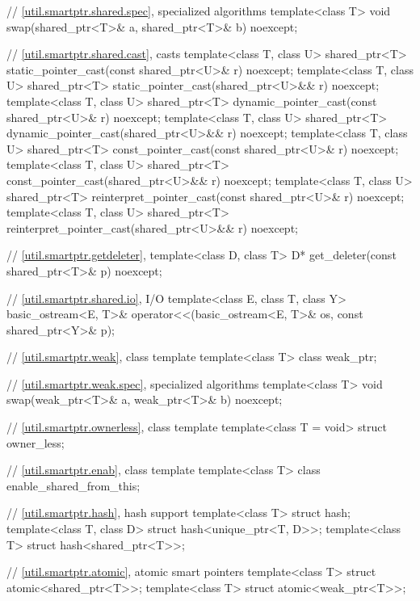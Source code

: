 \begin{codeblock}
{  // \ref{util.smartptr.shared.spec},  specialized algorithms
  template<class T>
    void swap(shared_ptr<T>& a, shared_ptr<T>& b) noexcept;

  // \ref{util.smartptr.shared.cast},  casts
  template<class T, class U>
    shared_ptr<T> static_pointer_cast(const shared_ptr<U>& r) noexcept;
  template<class T, class U>
    shared_ptr<T> static_pointer_cast(shared_ptr<U>&& r) noexcept;
  template<class T, class U>
    shared_ptr<T> dynamic_pointer_cast(const shared_ptr<U>& r) noexcept;
  template<class T, class U>
    shared_ptr<T> dynamic_pointer_cast(shared_ptr<U>&& r) noexcept;
  template<class T, class U>
    shared_ptr<T> const_pointer_cast(const shared_ptr<U>& r) noexcept;
  template<class T, class U>
    shared_ptr<T> const_pointer_cast(shared_ptr<U>&& r) noexcept;
  template<class T, class U>
    shared_ptr<T> reinterpret_pointer_cast(const shared_ptr<U>& r) noexcept;
  template<class T, class U>
    shared_ptr<T> reinterpret_pointer_cast(shared_ptr<U>&& r) noexcept;

  // \ref{util.smartptr.getdeleter},  
  template<class D, class T>
    D* get_deleter(const shared_ptr<T>& p) noexcept;

  // \ref{util.smartptr.shared.io},  I/O
  template<class E, class T, class Y>
    basic_ostream<E, T>& operator<<(basic_ostream<E, T>& os, const shared_ptr<Y>& p);

  // \ref{util.smartptr.weak}, class template 
  template<class T> class weak_ptr;

  // \ref{util.smartptr.weak.spec},  specialized algorithms
  template<class T> void swap(weak_ptr<T>& a, weak_ptr<T>& b) noexcept;

  // \ref{util.smartptr.ownerless}, class template 
  template<class T = void> struct owner_less;

  // \ref{util.smartptr.enab}, class template 
  template<class T> class enable_shared_from_this;

  // \ref{util.smartptr.hash}, hash support
  template<class T> struct hash;
  template<class T, class D> struct hash<unique_ptr<T, D>>;
  template<class T> struct hash<shared_ptr<T>>;

  // \ref{util.smartptr.atomic}, atomic smart pointers
  template<class T> struct atomic<shared_ptr<T>>;
  template<class T> struct atomic<weak_ptr<T>>;
}
\end{codeblock}

